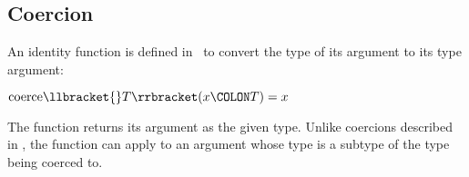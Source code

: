 %
%
%
%

\subsection{Coercion}

An identity function  is defined in \library\
to convert the type of its argument to its type argument:
\begin{Fortress}
\(\mathrm{coerce}\llbracket{}T\rrbracket(x\COLON T) = x\)
\end{Fortress}
The function returns its argument as the given type.
Unlike coercions described in ,
the  function can apply to an argument whose type is
a subtype of the type being coerced to.
